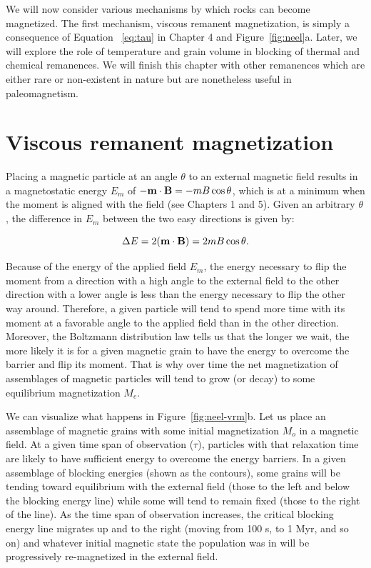 We will now consider various mechanisms by which rocks can become magnetized.  The first mechanism, 
viscous remanent magnetization,  is  simply a consequence of Equation ~\ref{eq:tau}  in Chapter 4 and Figure~\ref{fig:neel}a.    Later, we will explore the role of temperature and grain volume in blocking of thermal and chemical  remanences.    We will finish this chapter with other remanences which are either rare or non-existent in nature but are nonetheless useful in paleomagnetism.  


\section {Viscous remanent magnetization}
\label{sect:vrm}


 Placing a magnetic particle at an angle $\theta$ to an external magnetic field results in a magnetostatic energy $E_m$ of $-\hbox{\bf m} \cdot \hbox{\bf B} = -mB\,\hbox{cos}\, \theta$, which is at a minimum when the moment is aligned with the field (see Chapters 1 and 5).      Given an arbitrary $\theta$, the difference in $E_m$ between the two easy directions is given by: 

\begin{equation}
\Delta E = 2(\hbox{\bf m} \cdot \hbox{\bf B}) = 2mB \,\hbox{cos}\, \theta.
\label{eq:deltaE}
\end{equation}



Because of the energy of the applied field $E_m$, the energy necessary to flip the moment from a direction with a high angle to the external field to the other direction with a lower angle is less than the energy necessary to flip the other way around.   Therefore, a given particle will tend to spend more time with its moment at a favorable angle to the applied field than in the other direction.  
Moreover,  the 
Boltzmann distribution law tells us that the longer we wait, the more likely it is  for a given magnetic grain to have the energy to overcome the barrier and flip its moment.   That is why over time the net magnetization of assemblages of magnetic particles  will tend to grow (or decay) to some 
equilibrium magnetization $M_e$.  

We can visualize what happens in Figure~\ref{fig:neel-vrm}b.  Let us place an assemblage of magnetic grains with some initial magnetization $M_o$ in a magnetic field.   At a given time span of observation ($\tau$),  particles with that relaxation time are likely to have sufficient energy to overcome the energy barriers.   In a given assemblage of 
 blocking energies (shown as the contours),  some grains will be tending toward equilibrium with the external field (those to the left and below the blocking energy line) while some will tend to remain fixed (those to the right of the line).  As the time span of observation increases,  the critical blocking energy line migrates  up and to the right (moving from 100 s, to 1 Myr,  and so on) and whatever initial magnetic state the population was in will be progressively re-magnetized in the external field.  


